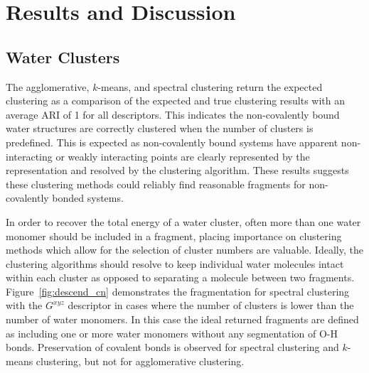 


\section{\label{sec:frag_results} Results and Discussion}

\subsection{Water Clusters}
The agglomerative, $k$-means, and spectral clustering return the expected clustering as a comparison of the expected and true clustering results with an average ARI of 1 for all descriptors.
This indicates the non-covalently bound water structures are correctly clustered when the number of clusters is predefined.
This is expected as non-covalently bound systems have apparent non-interacting or weakly interacting points are clearly represented by the representation and resolved by the clustering algorithm.
These results suggests these clustering methods could reliably find reasonable fragments for non-covalently bonded systems.

In order to recover the total energy of a water cluster, often more than one water monomer should be included in a fragment, placing importance on clustering methods which allow for the selection of cluster numbers are valuable.
Ideally, the clustering algorithms should resolve to keep individual water molecules intact within each cluster as opposed to separating a molecule between two fragments.\autocite{Herbert2019}
Figure~\ref{fig:descend_cn} demonstrates the fragmentation for spectral clustering with the $G^{xyz}$ descriptor in cases where the number of clusters is lower than the number of water monomers. 
In this case the ideal returned fragments are defined as including one or more water monomers without any segmentation of O-H bonds.
Preservation of covalent bonds is observed for spectral clustering and $k$-means clustering, but not for agglomerative clustering.

